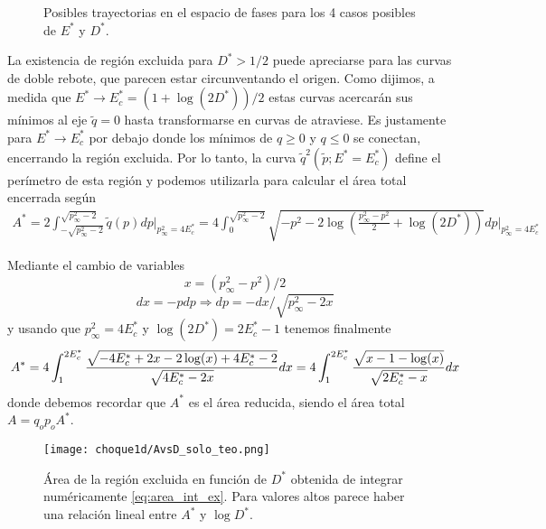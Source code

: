 \begin{figure}[H]
	\centering					%
	\caption{Posibles trayectorias en el espacio de fases para los 4 casos posibles de $E^*$ y $D^*$.}
	\label{fig:curvas_teo}
\end{figure}

La existencia de región excluida para $D^*>1/2$ puede apreciarse para las curvas de doble rebote, que parecen estar circunventando el origen.
Como dijimos, a medida que $E^*\to E^*_c = (1+\log(2D^*))/2$ estas curvas acercarán sus mínimos al eje $\tilde{q}=0$ hasta transformarse en curvas de atraviese.
Es justamente para $E^*\to E^*_c $ por debajo donde los mínimos de $q\geq0$ y $q\leq0$ se conectan, encerrando la región excluida.
Por lo tanto, la curva $\tilde{q}^2(\tilde{p}; E^*=E_c^*)$ define el perímetro de esta región y podemos utilizarla para calcular el área total encerrada según
\begin{align*}
A^* = 2\int_{-\sqrt{p_\infty^2-2}}^{\sqrt{p_\infty^2-2}} \tilde{q}(p) dp \Bigg|_{p_\infty^2=4E^*_c}
= 4\int_{0}^{\sqrt{p_\infty^2-2}} \sqrt{-p^2 - 2\log\left( \frac{p_\infty^2-p^2}{2} + \log(2D^*) \right)} dp \Bigg|_{p_\infty^2=4E^*_c}
\end{align*}

Mediante el cambio de variables 
\[x = (p_\infty^2-p^2)/2\]
\[dx = -p dp \Rightarrow dp = -dx/\sqrt{p_\infty^2-2x}\] 
y usando que $p_\infty^2 = 4E^*_c$ y $\log(2D^*) = 2E_c^* - 1$ tenemos finalmente
\begin{equation}{\label{eq:area_int_ex}}
A^* = 4\int_{1}^{2E_c^*} \frac{\sqrt{-4E_c^* + 2x - 2\log(x) + 4E_c^* - 2}}{\sqrt{4E_c^* - 2x}} dx
= 4\int_{1}^{2E_c^*} \frac{\sqrt{x -1 - \log(x)}}{\sqrt{2E_c^* - x}} dx
\end{equation}
donde debemos recordar que $A^*$ es el área reducida, siendo el área total $A = q_op_oA^*$.

\begin{figure}[H]
	\centering		%
	\texttt{[image: choque1d/AvsD\_solo\_teo.png]}
	\caption{Área de la región excluida en función de $D^*$ obtenida de integrar numéricamente \eqref{eq:area_int_ex}. Para valores altos parece haber una relación lineal entre $A^*$ y $\log D^*$.}
	\label{fig:AvsD_teo}
\end{figure}


